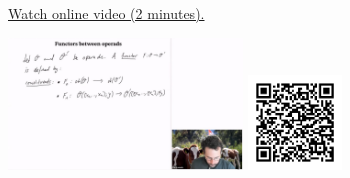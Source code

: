 
\begin{minipage}{10cm}
    \href{https://act4e-spring21.netlify.app/videos/spring2021-operads-b:functors-operads.html}{Watch online video (2 minutes).}
        
    \href{https://act4e-spring21.netlify.app/videos/spring2021-operads-b:functors-operads.html}{\includegraphics[height=3.5cm]{spring2021-operads-b:functors-operads/thumbnails.jpg}}
    \href{https://act4e-spring21.netlify.app/videos/spring2021-operads-b:functors-operads.html}{\includegraphics[height=2.5cm]{spring2021-operads-b:functors-operads/qrcode.png}}
\end{minipage}
